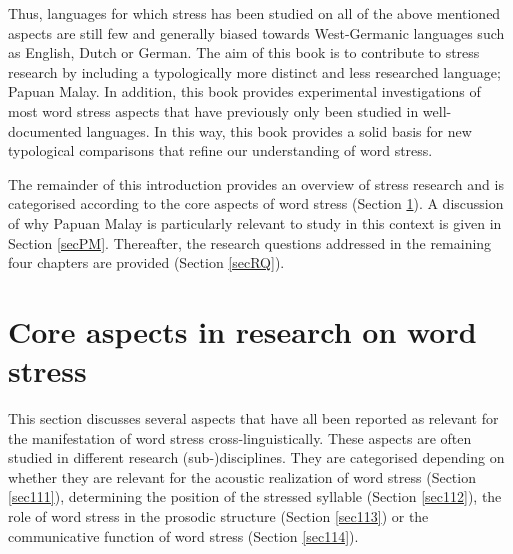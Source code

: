 Thus, languages for which stress has been studied on all of the above mentioned aspects are still few and generally biased towards West-Germanic languages such as English, Dutch or German. The aim of this book is to contribute to stress research by including a typologically more distinct and less researched language; Papuan Malay. In addition, this book provides experimental investigations of most word stress aspects that have previously only been studied in well-documented languages. In this way, this book provides a solid basis for new typological comparisons that refine our understanding of word stress.

The remainder of this introduction provides an overview of stress research and is categorised according to the core aspects of word stress (Section \ref{secCoreaspects}). A discussion of why Papuan Malay is particularly relevant to study in this context is given in Section \ref{secPM}. Thereafter, the research questions addressed in the remaining four chapters are provided (Section \ref{secRQ}).

\section{Core aspects in research on word stress} \label{secCoreaspects}

This section discusses several aspects that have all been reported as relevant for the manifestation of word stress cross-linguistically. These aspects are often studied in different research (sub-)disciplines. They are categorised depending on whether they are relevant for the acoustic realization of word stress (Section \ref{sec111}), determining the position of the stressed syllable (Section \ref{sec112}), the role of word stress in the prosodic structure (Section \ref{sec113}) or the communicative function of word stress (Section \ref{sec114}).

